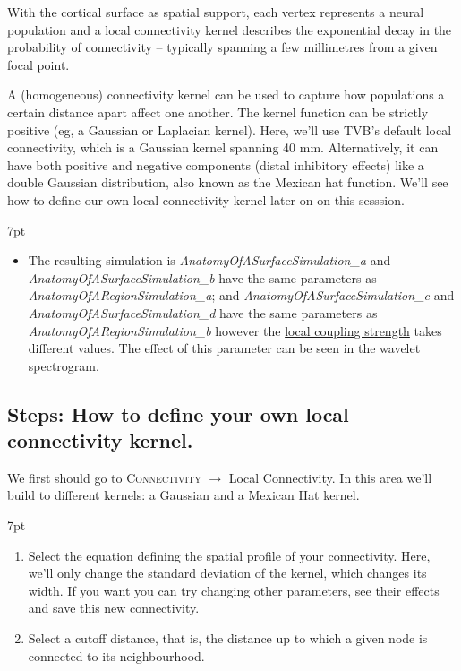 \documentclass{tufte-handout}
\newenvironment{formal}{%
  \def\FrameCommand{%
    \hspace{1pt}%
    {\color{DarkBlue}\vrule width 2pt}%
    {\color{formalshade}\vrule width 4pt}%
    \colorbox{formalshade}%
  }%
  \MakeFramed{\advance\hsize-\width\FrameRestore}%
  \noindent\hspace{-4.55pt}%
  \begin{adjustwidth}{}{7pt}%
  \vspace{2pt}\vspace{2pt}%
}
{%
  \vspace{2pt}\end{adjustwidth}\endMakeFramed%
}
\newenvironment{simulation}{%
  \def\FrameCommand{%
    \hspace{1pt}%
    {\color{ForestGreen}\vrule width 2pt}%
    {\color{simulationshade}\vrule width 4pt}%
    \colorbox{simulationshade}%
  }%
  \MakeFramed{\advance\hsize-\width\FrameRestore}%
  \noindent\hspace{-4.55pt}%
  \begin{adjustwidth}{}{7pt}%
  \vspace{2pt}\vspace{2pt}%
}
{%
  \vspace{2pt}\end{adjustwidth}\endMakeFramed%
}
\begin{document}
With the cortical surface as spatial support, each vertex represents a neural
population and a local connectivity kernel describes the exponential decay in
the probability of connectivity – typically spanning a few millimetres from a
given focal point.

A (homogeneous) connectivity kernel can be used to capture how populations a
certain distance apart affect one another. The kernel function can be strictly
positive (eg, a Gaussian or Laplacian kernel). Here, we'll use TVB's default
local connectivity, which is a Gaussian kernel spanning 40 mm. Alternatively,
it can have both positive and negative components (distal inhibitory effects)
like a double Gaussian distribution, also known as the Mexican hat function.
We'll see how to define our own local connectivity kernel later on on this
sesssion.

\begin{simulation}
\begin{itemize}
 \item The resulting simulation is \textit{AnatomyOfASurfaceSimulation\_a} and  \textit{AnatomyOfASurfaceSimulation\_b} have the same parameters as \textit{AnatomyOfARegionSimulation\_a}; and \textit{AnatomyOfASurfaceSimulation\_c} and \textit{AnatomyOfASurfaceSimulation\_d} have the same parameters as \textit{AnatomyOfARegionSimulation\_b} however the \underline{local coupling strength} takes different values. The effect of this parameter can be seen in the wavelet spectrogram.
\end{itemize}
\end{simulation}

\subsection{Steps: How to define your own local connectivity kernel.}\label{sec:steps}


We first should go to \textsc{Connectivity} $\rightarrow$ {Local Connectivity}. 
In this area we'll build to different kernels: a Gaussian and a Mexican Hat kernel. 

\begin{formal}
\begin{enumerate}
\item Select the equation defining the spatial profile of your connectivity. Here, we'll only change the standard deviation of the kernel, which changes its width. If you want you can try changing other parameters, see their effects and save this new connectivity.
\item Select a cutoff distance, that is, the distance up to which a given node is connected to its neighbourhood.
\end{enumerate}
\end{formal}
\end{document}

